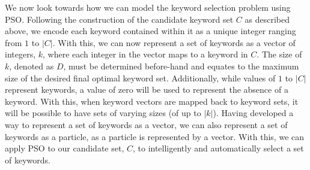 \documentclass[runningheads]{llncs}
\begin{document}
We now look towards how we can model the keyword selection problem using PSO. Following the construction of the candidate keyword set $C$ as described above, we encode each keyword contained within it as a unique integer ranging from $1$ to $|C|$. With this, we can now represent a set of keywords as a vector of integers, $k$, where each integer in the vector maps to a keyword in $C$. The size of $k$, denoted as $D$, must be determined before-hand and equates to the maximum size of the desired final optimal keyword set. Additionally, while values of $1$ to $|C|$ represent keywords, a value of zero will be used to represent the absence of a keyword. With this, when keyword vectors are mapped back to keyword sets, it will be possible to have sets of varying sizes (of up to $|k|$). Having developed a way to represent a set of keywords as a vector, we can also represent a set of keywords as a particle, as a particle is represented by a vector. With this, we can apply PSO to our candidate set, $C$, to intelligently and automatically select a set of keywords.
\end{document}
